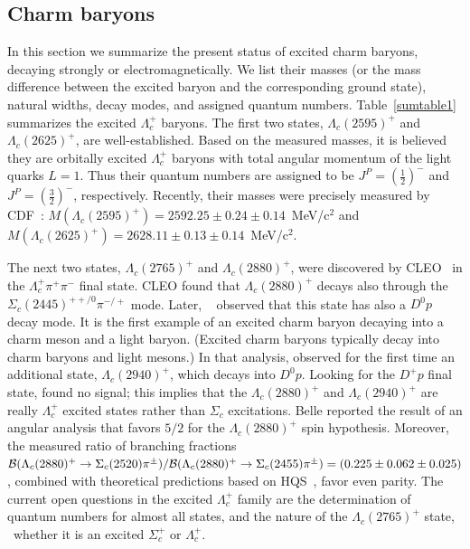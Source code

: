 \subsection{Charm baryons}

In this section we summarize the present status of excited charm
baryons, decaying strongly or electromagnetically. We list their
masses (or the mass difference between the excited baryon and the
corresponding ground state), natural widths, decay modes, and 
assigned quantum numbers. 
Table~\ref{sumtable1} summarizes the excited $\Lambda_c^+$ baryons.  
The first two states, $\Lambda_c(2595)^+$ and $\Lambda_c(2625)^+$,
are well-established. 
Based on the measured masses, it is believed they are orbitally 
excited $\Lambda_c^+$ baryons with total angular momentum of the
light quarks $L=1$. Thus their quantum numbers are assigned to be 
$J^P=(\frac{1}{2})^-$ and $J^P=(\frac{3}{2})^-$, respectively. 
Recently, their masses 
were precisely measured by CDF~\cite{Aaltonen:2011sf}: 
$M(\Lambda_c(2595)^+)=2592.25\pm 0.24\pm 0.14$~MeV/c$^2$ and
$M(\Lambda_c(2625)^+)=2628.11\pm 0.13\pm 0.14$~MeV/c$^2$. 

The next two states, $\Lambda_c(2765)^+$ and $\Lambda_c(2880)^+$, 
were discovered by CLEO~\cite{Artuso:2000xy} in the $\Lambda_c^+\pi^+\pi^-$ 
final state. CLEO found that $\Lambda_c(2880)^+$ decays also through
the $\Sigma_c(2445)^{++/0}\pi^{-/+}$ mode. 
Later, \babar~\cite{Aubert:2006sp} 
observed that this state has also a $D^0 p$ decay mode. It is the 
first example of an excited charm baryon decaying into a charm meson 
and a light baryon. (Excited charm baryons typically decay into charm 
baryons and light mesons.) In that analysis, \babar observed for the
first time an additional state, $\Lambda_c(2940)^+$, 
which decays into $D^0 p$. Looking for the $D^+ p$ final state,
\babar found no signal; this implies that the $\Lambda_c(2880)^+$ 
and $\Lambda_c(2940)^+$ are really $\Lambda_c^+$ excited states
rather than $\Sigma_c$ excitations. 
Belle reported the result of an angular analysis that favors
$5/2$ for the $\Lambda_c(2880)^+$ spin hypothesis. 
Moreover, the measured ratio of branching fractions 
${\cal B}(\Lambda_c(2880)^+\rightarrow \Sigma_c(2520)\pi^{\pm})/{\cal B}(\Lambda_c(2880)^+\rightarrow \Sigma_c(2455)\pi^{\pm})=(0.225\pm 0.062\pm 0.025)$, combined 
with theoretical predictions based on HQS~\cite{Isgur:1991wq,Cheng:2006dk}, 
favor even parity.     
The current open questions in the excited $\Lambda_c^+$ family are
the determination of quantum numbers for almost all states, and 
the nature of the $\Lambda_c(2765)^+$ state, \ie\ whether it is
an excited $\Sigma_c^+$ or $\Lambda_c^+$.

